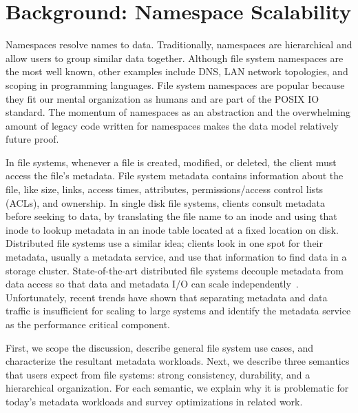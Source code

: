 \chapter{Background: Namespace Scalability}
\label{chp:related-work}

Namespaces resolve names to data. Traditionally, namespaces are hierarchical
and allow users to group similar data together. Although file system namespaces
are the most well known, other examples include DNS, LAN network topologies,
and scoping in programming languages.  File system namespaces are popular
because they fit our mental organization as humans and are part of the POSIX IO
standard. The momentum of namespaces as an abstraction and the overwhelming
amount of legacy code written for namespaces makes the data model relatively
future proof.

In file systems, whenever a file is created, modified, or deleted, the client
must access the file's metadata. File system metadata contains information
about the file, like size, links, access times, attributes, permissions/access
control lists (ACLs), and ownership.  In single disk file systems, clients
consult metadata before seeking to data, by translating the file name to an
inode and using that inode to lookup metadata in an inode table located at a
fixed location on disk.  Distributed file systems use a similar idea; clients
look in one spot for their metadata, usually a metadata service, and use that
information to find data in a storage cluster.  State-of-the-art distributed
file systems decouple metadata from data access so that data and metadata I/O
can scale independently~\cite{alam:pdsw2011-metadata-scaling,
ghemawat:sosp2003-gfs, hildebrand:msst2005-pnfs, weil:osdi2006-ceph,
welch:fast2008-panasas, xing:sc2009-skyfs}.  Unfortunately, recent trends have
shown that separating metadata and data traffic is insufficient for scaling to
large systems and identify the metadata service as the performance critical
component.

First, we scope the discussion, describe general file system use cases, and
characterize the resultant metadata workloads. Next, we describe three
semantics that users expect from file systems: strong consistency, durability,
and a hierarchical organization.  For each semantic, we explain why it is
problematic for today's metadata workloads and survey optimizations in related
work.

